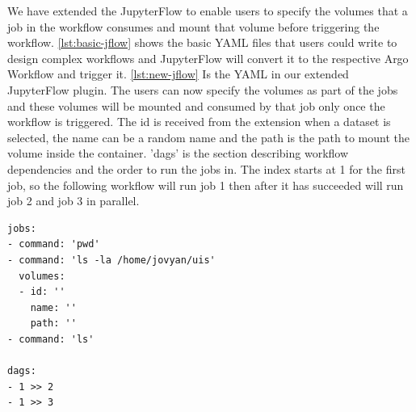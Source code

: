 \bigskip
We have extended the JupyterFlow to enable users to specify the volumes that a job in the workflow consumes and mount that volume before triggering the workflow. \ref{lst:basic-jflow} shows the basic YAML files that users could write to design complex workflows and JupyterFlow will convert it to the respective Argo Workflow and trigger it. \ref{lst:new-jflow} Is the YAML in our extended JupyterFlow plugin. The users can now specify the volumes as part of the jobs and these volumes will be mounted and consumed by that job only once the workflow is triggered. The id is received from the extension when a dataset is selected, the name can be a random name and the path is the path to mount the volume inside the container. 'dags' is the section describing workflow dependencies and the order to run the jobs in. The index starts at 1 for the first job, so the following workflow will run job 1 then after it has succeeded will run job 2 and job 3 in parallel.

\begin{lstlisting}[caption={YAML for mounting volumes using JupyterFlow in workflows in our custom JupyterFlow},label={lst:new-jflow}]
jobs:
- command: 'pwd' 
- command: 'ls -la /home/jovyan/uis'
  volumes:
  - id: ''
    name: ''
    path: ''
- command: 'ls'

dags:
- 1 >> 2
- 1 >> 3
\end{lstlisting}